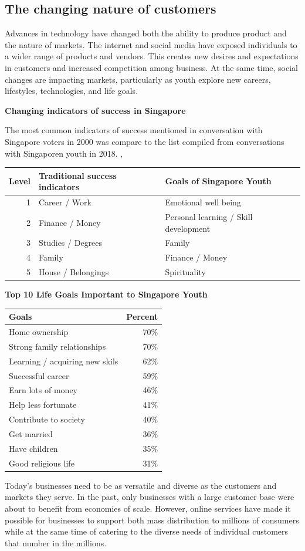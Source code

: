 \documentclass[]{book}
\let\BeginKnitrBlock\begin \let\EndKnitrBlock\end
\begin{document}
\hypertarget{the-changing-nature-of-customers}{%
\subsection{The changing nature of customers}\label{the-changing-nature-of-customers}}

Advances in technology have changed both the ability to produce product and the nature of markets. The internet and social media have exposed individuals to a wider range of products and vendors. This creates new desires and expectations in customers and increased competition among business. At the same time, social changes are impacting markets, particularly as youth explore new careers, lifestyles, technologies, and life goals.

\BeginKnitrBlock{rmdextra}
\textbf{Changing indicators of success in Singapore}

The most common indicators of success mentioned in conversation with Singapore voters in 2000 was compare to the list compiled from conversations with Singaporen youth in 2018. \citep{SNYCYC2019}, \citep{Tan2019}

\begin{longtable}[]{@{}rll@{}}
\toprule
Level & Traditional success indicators & Goals of Singapore Youth\tabularnewline
\midrule
\endhead
1 & Career / Work & Emotional well being\tabularnewline
2 & Finance / Money & Personal learning / Skill development\tabularnewline
3 & Studies / Degrees & Family\tabularnewline
4 & Family & Finance / Money\tabularnewline
5 & House / Belongings & Spirituality\tabularnewline
\bottomrule
\end{longtable}

\textbf{Top 10 Life Goals Important to Singapore Youth}

\begin{longtable}[]{@{}lr@{}}
\toprule
Goals & Percent\tabularnewline
\midrule
\endhead
Home ownership & 70\%\tabularnewline
Strong family relationships & 70\%\tabularnewline
Learning / acquiring new skils & 62\%\tabularnewline
Successful career & 59\%\tabularnewline
Earn lots of money & 46\%\tabularnewline
Help less fortunate & 41\%\tabularnewline
Contribute to society & 40\%\tabularnewline
Get married & 36\%\tabularnewline
Have children & 35\%\tabularnewline
Good religious life & 31\%\tabularnewline
\bottomrule
\end{longtable}
\EndKnitrBlock{rmdextra}

Today's businesses need to be as versatile and diverse as the customers and markets they serve. In the past, only businesses with a large customer base were about to benefit from economies of scale. However, online services have made it possible for businesses to support both mass distribution to millions of consumers while at the same time of catering to the diverse needs of individual customers that number in the millions.
\end{document}
